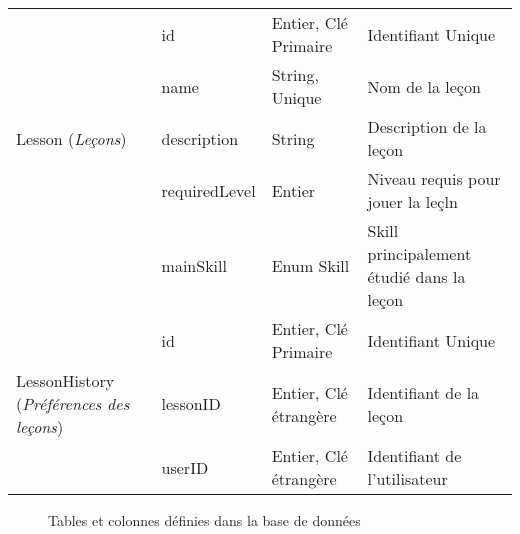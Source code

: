 \begin{longtable}[c]{@{}|p{}|p{}|p{}|p{}|@{}}
														& id                                                   & Entier, Clé Primaire                                                                     & Identifiant Unique                                                                       \\* \cline{2-4} 
														& name                                                 & String, Unique                                                                           & Nom de la leçon                                                                          \\* \cline{2-4} 
	\multirow{-3}{0.18\textwidth}{Lesson (\textit{Leçons})}							& description                                          & String                                                                                   & Description de la leçon                                                                  \\* \cline{2-4} 
														& requiredLevel                                        & Entier                                                                                   & Niveau requis pour jouer la leçln                                                        \\* \cline{2-4} 
							                            & mainSkill                                            & Enum Skill                                                                               & Skill principalement étudié dans la leçon                                                \\* \hline
														& id                                                   & Entier, Clé Primaire                                                                     & Identifiant Unique                                                                       \\* \cline{2-4} 
	\multirow{-2}{0.18\textwidth}{LessonHistory (\textit{Préférences des leçons})}						& lessonID                                             & Entier, Clé étrangère                                                                    & Identifiant de la leçon                                                                  \\* \cline{2-4} 
									                    & userID                                               & Entier, Clé étrangère                                                                    & Identifiant de l'utilisateur                                                             \\* \hline
\end{longtable}
\begin{figure}[H]
	\caption{Tables et colonnes définies dans la base de données}
\end{figure}